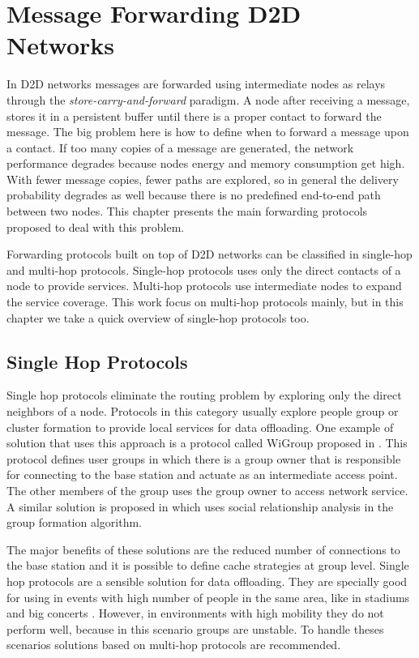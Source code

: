 \chapter{Message Forwarding D2D Networks}
\label{ch:MessageForwarding}

In D2D networks messages are forwarded using intermediate nodes as relays through the \textit{store-carry-and-forward} paradigm. A node after receiving a message,
stores it in a persistent buffer until there is a proper contact to forward the message. The big problem here is how to define when to forward a message upon a contact.
If too many copies of a message are generated, the network performance degrades because nodes energy and memory consumption get high. With fewer message copies, fewer paths
are explored, so in general the delivery probability degrades as well because there is no predefined end-to-end path between two nodes. This chapter presents the main forwarding
protocols proposed to deal with this problem.

Forwarding protocols built on top of D2D networks can be classified in single-hop and multi-hop protocols. Single-hop protocols uses only the direct contacts of a node to provide
services. Multi-hop protocols use intermediate nodes to expand the service coverage. This work focus on multi-hop protocols mainly, but in this chapter we take a quick overview of single-hop
protocols too.

\section{Single Hop Protocols}

Single hop protocols eliminate the routing problem by exploring only the direct neighbors of a node.
Protocols in this category usually explore people group or cluster formation to provide local services for data offloading.
One example of solution that uses this approach is a protocol called WiGroup proposed in \cite{wang2015wigroup}.
This protocol defines user groups in which there is a group owner that is responsible for connecting to the base station
and actuate as an intermediate access point. The other members of the group uses the group owner to access network service.
A similar solution is proposed in \cite{zheng2014social} which uses social relationship analysis in the group formation algorithm.

The major benefits of these solutions are the reduced number of connections to the base station and it is possible to define cache strategies at group level.
Single hop protocols are a sensible solution for data offloading. They are specially good for using in events with high number of people in the same area, like in
stadiums and big concerts \cite{wang2015wigroup}. However, in environments with high mobility they do not perform well, because in this scenario groups are unstable.
To handle theses scenarios solutions based on multi-hop protocols are recommended.

